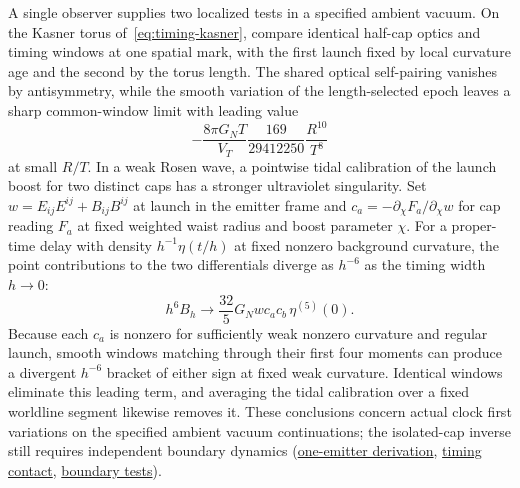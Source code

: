 \documentclass[10pt,a4paper]{article}
\numberwithin{equation}{section}
\newcommand{\repo}[2]{\href{https://github.com/sprajs/quantum-gravity/blob/main/#1}{#2}}
\begin{document}
A single observer supplies two localized tests in a specified ambient vacuum. On the Kasner torus of~\eqref{eq:timing-kasner}, compare identical half-cap optics and timing windows at one spatial mark, with the first launch fixed by local curvature age and the second by the torus length. The shared optical self-pairing vanishes by antisymmetry, while the smooth variation of the length-selected epoch leaves a sharp common-window limit with leading value
\[
     -\frac{8\pi G_NT}{V_T}\frac{169}{29412250}\frac{R^{10}}{T^8}
\]
at small $R/T$. In a weak Rosen wave, a pointwise tidal calibration of the launch boost for two distinct caps has a stronger ultraviolet singularity. Set $w=E_{ij}E^{ij}+B_{ij}B^{ij}$ at launch in the emitter frame and $c_a=-\partial_\chi F_a/\partial_\chi w$ for cap reading $F_a$ at fixed weighted waist radius and boost parameter $\chi$. For a proper-time delay with density $h^{-1}\eta(t/h)$ at fixed nonzero background curvature, the point contributions to the two differentials diverge as $h^{-6}$ as the timing width $h\to0$:
\[
 h^6 B_h\longrightarrow \frac{32}{5}G_N w c_a c_b\,\eta^{(5)}(0).
\]
Because each $c_a$ is nonzero for sufficiently weak nonzero curvature and regular launch, smooth windows matching through their first four moments can produce a divergent $h^{-6}$ bracket of either sign at fixed weak curvature. Identical windows eliminate this leading term, and averaging the tidal calibration over a fixed worldline segment likewise removes it. These conclusions concern actual clock first variations on the specified ambient vacuum continuations; the isolated-cap inverse still requires independent boundary dynamics (\repo{audit/local-clock-control.md}{one-emitter derivation}, \repo{audit/local-curved-bracket.md}{timing contact}, \repo{audit/isolated-cap-test.md}{boundary tests}).
\end{document}
